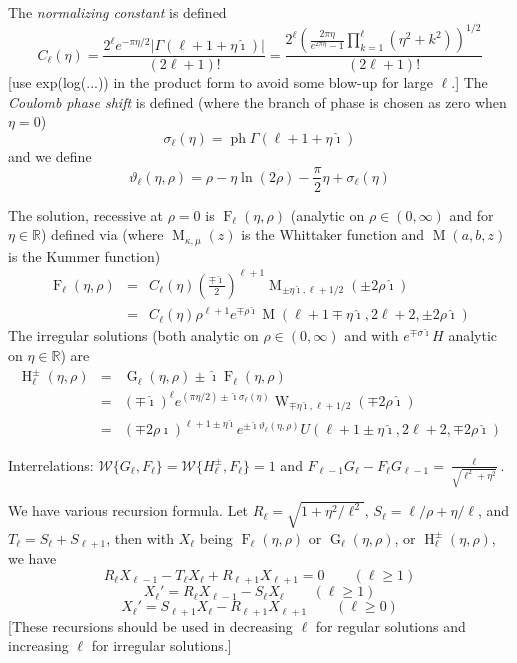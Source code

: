 \documentclass[10pt,dvipdfmx,letterpaper,twoside]{article}
\let\O=\operatorname
\newcommand{\RR}{{\mathbb{R}}}
\newcommand{\ii}{{\hat{\imath}}}
\let\Gam=\Gamma
\let\kap=\kappa
\let\sig=\sigma
\let\theta=\vartheta
\begin{document}
The {\em normalizing constant} is defined
\[ C_\ell(\eta) = \frac{2^\ell e^{-\pi\eta/2} |\Gam(\ell+1+\eta\ii)|}{(2\ell+1)!}
    = \frac{2^\ell \left( \frac{2\pi\eta}{e^{2\pi\eta} - 1} \prod_{k=1}^\ell(\eta^2 + k^2)\right)^{1/2}}{(2\ell+1)!} \]
[use exp(log(...)) in the product form to avoid some blow-up for large $\ell$.]
The {\em Coulomb phase shift} is defined (where the branch of phase is chosen as zero when $\eta=0$)
\[ \sig_\ell(\eta) = \O{ph} \Gam(\ell+1+\eta\ii) \]
and we define
\[ \theta_\ell(\eta,\rho) = \rho - \eta\ln(2\rho) - \frac\pi2\eta + \sig_\ell(\eta) \]

The solution, recessive at $\rho=0$ is $\O{F}_\ell(\eta,\rho)$ (analytic on $\rho\in(0,\infty)$ and for $\eta\in\RR$)
defined via (where $\O{M}_{\kap,\mu}(z)$ is the Whittaker function and $\O{M}(a,b,z)$ is the Kummer function)
\begin{eqnarray*}
\O{F}_\ell(\eta,\rho)
    &=& C_\ell(\eta) \left(\frac{\mp\ii}{2}\right)^{\ell+1} \O{M}_{\pm\eta\ii, \ell+1/2}(\pm2\rho\ii) \\
    &=& C_\ell(\eta) \rho^{\ell+1} e^{\mp\rho\ii} \O{M}(\ell+1\mp\eta\ii, 2\ell+2, \pm2\rho\ii)
\end{eqnarray*}
The irregular solutions (both analytic on $\rho\in(0,\infty)$ and with $e^{\mp\sig\ii}H$ analytic on $\eta\in\RR$) are
\begin{eqnarray*}
\O{H}_\ell^\pm(\eta,\rho)
    &=& \O{G}_\ell(\eta,\rho) \pm \ii \O{F}_\ell(\eta,\rho) \\
    &=& (\mp\ii)^{\ell} e^{(\pi\eta/2)\pm\ii\sig_\ell(\eta)} \O{W}_{\mp\eta\ii, \ell+1/2}(\mp2\rho\ii) \\
    &=& (\mp2\rho\ii)^{\ell+1\pm\eta\ii} e^{\pm\ii\theta_\ell(\eta,\rho)} U(\ell+1\pm\eta\ii, 2\ell+2, \mp2\rho\ii)
\end{eqnarray*}

Interrelations:
$\mathcal{W}\{G_\ell,F_\ell\} = \mathcal{W}\{H^\pm_\ell, F_\ell\} = 1$
and
$F_{\ell-1} G_\ell - F_\ell G_{\ell-1} = \frac{\ell}{\sqrt{\ell^2+\eta^2}}$.

We have various recursion formula.  Let $R_\ell = \sqrt{1 + \eta^2/\ell^2}$, $S_\ell = \ell/\rho + \eta/\ell$, and $T_\ell=S_\ell + S_{\ell+1}$,
then with $X_\ell$ being $\O{F}_\ell(\eta,\rho)$ or $\O{G}_\ell(\eta,\rho)$, or $\O{H}_\ell^\pm(\eta,\rho)$, we have
\[ R_\ell X_{\ell-1} - T_\ell X_\ell + R_{\ell+1} X_{\ell+1} = 0 \qquad (\ell\geq1) \]
\[ X_\ell' = R_\ell X_{\ell-1} - S_\ell X_\ell \qquad (\ell\geq1) \]
\[ X_\ell' = S_{\ell+1} X_\ell - R_{\ell+1} X_{\ell+1} \qquad (\ell\geq0) \]
[These recursions should be used in decreasing $\ell$ for regular solutions and increasing $\ell$ for irregular solutions.]
\end{document}

